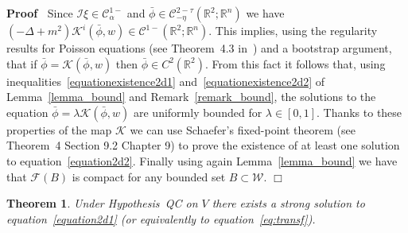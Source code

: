 \documentclass[a4paper,10pt]{article}
\newenvironment{proof}{\noindent\textbf{Proof\ }}{\hspace*{\fill}$\Box$\medskip}
\newtheorem{theorem}{Theorem}
\begin{document}
\begin{proof}
  Since $\mathcal{I} \xi \in \mathcal{C}^{1 -}_{\alpha}$ and $\bar{\phi} \in
  \mathcal{C}^{2 - \tau}_{- \eta} (\mathbb{R}^2 ; \mathbb{R}^n)$ we have $(-
  \Delta + m^2) \mathcal{K}^i (\bar{\phi}, w) \in \mathcal{C}^{1 -}
  (\mathbb{R}^2 ; \mathbb{R}^n)$. This implies, using the regularity results
  for Poisson equations (see Theorem~4.3 in~{\cite{Gilbarg2001}}) and a
  bootstrap argument, that if $\bar{\phi} = \mathcal{K} (\bar{\phi}, w)$ then
  $\bar{\phi} \in C^2 (\mathbb{R}^2)$. From this fact it follows that, using
  inequalities~{\eqref{equationexistence2d1}}
  and~{\eqref{equationexistence2d2}} of Lemma~\ref{lemma_bound} and
  Remark~\ref{remark_bound}, the solutions to the equation $\bar{\phi} =
  \lambda \mathcal{K} (\bar{\phi}, w) \mathcal{}$ are uniformly bounded for
  $\lambda \in [0, 1]$. Thanks to these properties of the map $\mathcal{K}$ we
  can use Schaefer's fixed-point theorem (see~{\cite{Evans1998}} Theorem~4
  Section 9.2 Chapter 9) to prove the existence of at least one solution to
  equation~{\eqref{equation2d2}}. Finally using again Lemma~\ref{lemma_bound}
  we have that $\mathcal{F} (B)$ is compact for any bounded set $B \subset
  \mathcal{W}$.
\end{proof}

\begin{theorem}
  \label{theorem_existence2}Under Hypothesis~QC on $V$ there exists a strong
  solution to equation~{\eqref{equation2d1}} (or equivalently to
  equation~{\eqref{eq:transf}}).
\end{theorem}
\end{document}
